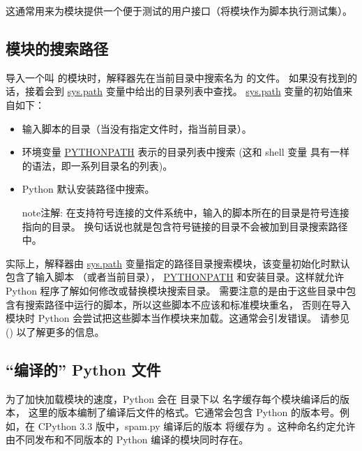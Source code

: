 \documentclass[a4paper,10pt,english]{sphinxmanual}
\begin{document}
这通常用来为模块提供一个便于测试的用户接口（将模块作为脚本执行测试集）。


\subsection{模块的搜索路径}
\label{modules:id5}\label{modules:tut-searchpath}
导入一个叫  的模块时，解释器先在当前目录中搜索名为  的文件。
如果没有找到的话，接着会到 \href{https://docs.python.org/3/library/sys.html\#sys.path}{sys.path} 变量中给出的目录列表中查找。 \href{https://docs.python.org/3/library/sys.html\#sys.path}{sys.path} 变量的初始值来自如下：
\begin{itemize}
\item {} 
输入脚本的目录（当没有指定文件时，指当前目录）。

\item {} 
环境变量 \href{https://docs.python.org/3/using/cmdline.html\#envvar-PYTHONPATH}{PYTHONPATH} 表示的目录列表中搜索
(这和 shell 变量  具有一样的语法，即一系列目录名的列表)。

\item {} 
Python 默认安装路径中搜索。

\begin{notice}{note}{注解:}
在支持符号连接的文件系统中，输入的脚本所在的目录是符号连接指向的目录。
换句话说也就是包含符号链接的目录不会被加到目录搜索路径中。
\end{notice}

\end{itemize}

实际上，解释器由 \href{https://docs.python.org/3/library/sys.html\#sys.path}{sys.path} 变量指定的路径目录搜索模块，该变量初始化时默认包含了输入脚本
（或者当前目录）， \href{https://docs.python.org/3/using/cmdline.html\#envvar-PYTHONPATH}{PYTHONPATH} 和安装目录。这样就允许 Python 程序了解如何修改或替换模块搜索目录。
需要注意的是由于这些目录中包含有搜索路径中运行的脚本，所以这些脚本不应该和标准模块重名，
否则在导入模块时 Python 会尝试把这些脚本当作模块来加载。这通常会引发错误。
请参见 {\hyperref[modules:tut-standardmodules]{\emph{}}} () 以了解更多的信息。


\subsection{“编译的” Python 文件}
\label{modules:python}
为了加快加载模块的速度，Python 会在  目录下以  名字缓存每个模块编译后的版本，
这里的版本编制了编译后文件的格式。它通常会包含 Python 的版本号。例如，在 CPython 3.3 版中，spam.py 编译后的版本
将缓存为 。这种命名约定允许由不同发布和不同版本的 Python 编译的模块同时存在。
\end{document}
